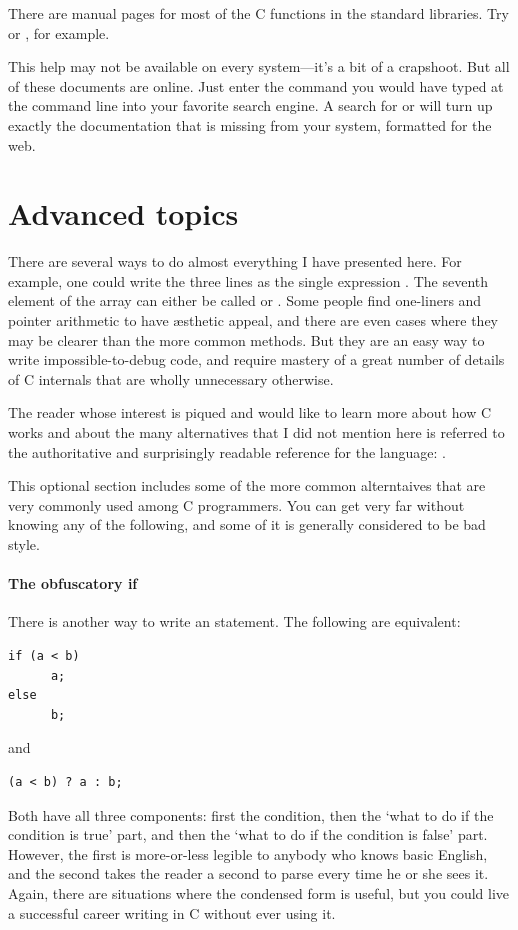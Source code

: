 \documentclass[12pt]{article}
\makeatletter
\def\ttind#1{\index{#1@\cinline{#1}}\cinline{#1}}
\makeatother
\begin{document}
There are manual pages for most of the C functions in the standard libraries. Try
 or , for example.

This help may not be available on every system---it's a bit of
a crapshoot. But all of these documents are online. Just enter the
command you would have typed at the command line into your favorite
search engine. A search for  or  will
turn up exactly the documentation that is missing from your system,
formatted for the web.

\section{Advanced topics}

There are several ways to do almost everything I have presented here.  For
example, one could write the three lines  as the single expression . The seventh
element of the array  can either be called  or
.  Some people find one-liners and pointer arithmetic
to have \ae{}sthetic appeal, and there are even cases where they may
be clearer than the more common methods. But they are an easy way to
write impossible-to-debug code, and require mastery of a great number
of details of C internals that are wholly unnecessary otherwise.

The reader whose interest is piqued and would like to learn more about
how C works and about the many alternatives that I did not mention here
is referred to the authoritative and surprisingly readable reference
for the language: \cite{kandr:c}.

This optional section includes some of the more common alterntaives that
are very commonly used among C programmers. You can get very far without
knowing any of the following, and some of it is generally considered to
be bad style.

\paragraph{The obfuscatory if} There is another way to write an \ttind{if} statement. The following are equivalent:
\begin{lstlisting}
if (a < b)
      a;
else
      b;
\end{lstlisting}
and
\begin{lstlisting}
(a < b) ? a : b;
\end{lstlisting}
Both have all three components: first the condition, then the `what to do if the
condition is true' part, and then the `what to do if the condition is false'
part. However, the first is more-or-less legible to anybody who knows basic English,
and the second takes the reader a second to parse every time he or she
sees it. Again, there are situations where the condensed form is useful,
but you could live a successful career writing in C without ever using it.
\end{document}
